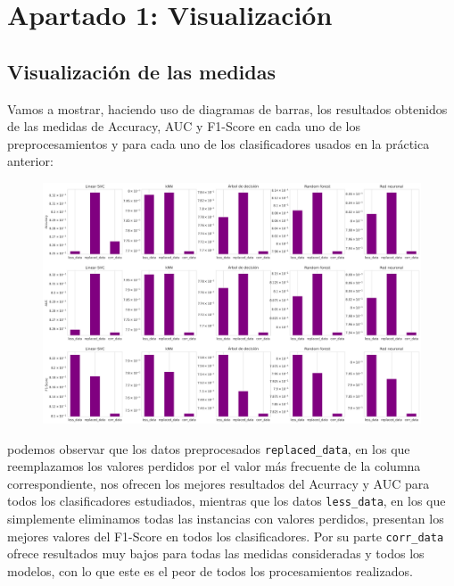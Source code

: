\documentclass[a4paper,11pt]{book}
\begin{document}

%


\tableofcontents
\newpage

\chapter{Apartado 1: Visualización}
\section{Visualización de las medidas}

Vamos a mostrar, haciendo uso de diagramas de barras, los resultados obtenidos de las medidas de Accuracy, AUC y F1-Score en cada uno de los preprocesamientos y para cada uno de los clasificadores usados en la práctica anterior:
\begin{center}
	\begin{figure}[H]
		\centering
		\includegraphics[width=1.1\linewidth]{img/preprocesamiento}
		\caption{}
		\label{fig:preprocesamiento}
	\end{figure}
\end{center}

podemos observar que los datos preprocesados \texttt{replaced_data}, en los que reemplazamos los valores perdidos por el valor más frecuente de la columna correspondiente, nos ofrecen los mejores resultados del Acurracy y AUC para todos los clasificadores estudiados, mientras que los datos \texttt{less_data}, en los que simplemente eliminamos todas las instancias con valores perdidos, presentan los mejores valores del F1-Score en todos los clasificadores. Por su parte \texttt{corr_data} ofrece resultados muy bajos para todas las medidas consideradas y todos los modelos, con lo que este es el peor de todos los procesamientos realizados.
\end{document}
